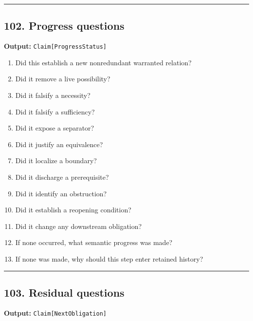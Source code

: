 \documentclass[
]{article}
\providecommand{\tightlist}{%
  \setlength{\itemsep}{0pt}\setlength{\parskip}{0pt}}
\begin{document}
\begin{center}\rule{0.5\linewidth}{0.5pt}\end{center}

\subsection{102. Progress questions}\label{progress-questions}

\textbf{Output:} \texttt{Claim{[}ProgressStatus{]}}

\begin{enumerate}
\def\labelenumi{\arabic{enumi}.}
\tightlist
\item
  Did this establish a new nonredundant warranted relation?
\item
  Did it remove a live possibility?
\item
  Did it falsify a necessity?
\item
  Did it falsify a sufficiency?
\item
  Did it expose a separator?
\item
  Did it justify an equivalence?
\item
  Did it localize a boundary?
\item
  Did it discharge a prerequisite?
\item
  Did it identify an obstruction?
\item
  Did it establish a reopening condition?
\item
  Did it change any downstream obligation?
\item
  If none occurred, what semantic progress was made?
\item
  If none was made, why should this step enter retained history?
\end{enumerate}

\begin{center}\rule{0.5\linewidth}{0.5pt}\end{center}

\subsection{103. Residual questions}\label{residual-questions}

\textbf{Output:} \texttt{Claim{[}NextObligation{]}}
\end{document}
